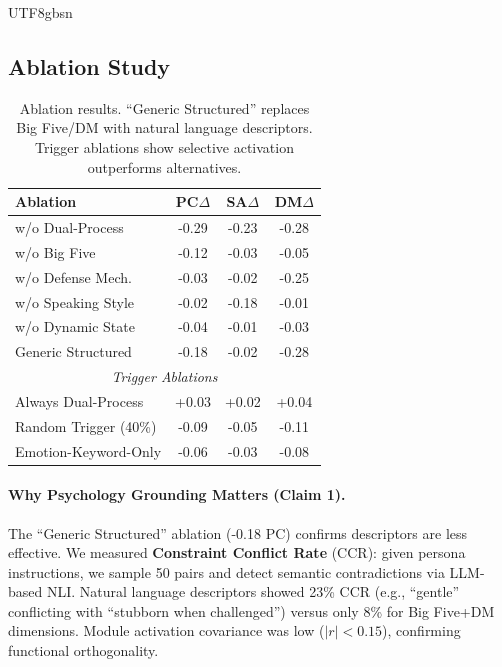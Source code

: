 \documentclass[11pt]{article}
\begin{document}
\begin{CJK*}{UTF8}{gbsn}
\subsection{Ablation Study}
\label{sec:ablation}

\begin{table}[t]
\centering
\small
\begin{tabular}{lccc}
\toprule
\textbf{Ablation} & \textbf{PC}$\Delta$ & \textbf{SA}$\Delta$ & \textbf{DM}$\Delta$ \\
\midrule
w/o Dual-Process & -0.29 & -0.23 & -0.28 \\
w/o Big Five & -0.12 & -0.03 & -0.05 \\
w/o Defense Mech. & -0.03 & -0.02 & -0.25 \\
w/o Speaking Style & -0.02 & -0.18 & -0.01 \\
w/o Dynamic State & -0.04 & -0.01 & -0.03 \\
Generic Structured & -0.18 & -0.02 & -0.28 \\
\midrule
\multicolumn{4}{c}{\textit{Trigger Ablations}} \\
\midrule
Always Dual-Process & +0.03 & +0.02 & +0.04 \\
Random Trigger (40\%) & -0.09 & -0.05 & -0.11 \\
Emotion-Keyword-Only & -0.06 & -0.03 & -0.08 \\
\bottomrule
\end{tabular}
\caption{Ablation results. ``Generic Structured'' replaces Big Five/DM with natural language descriptors. Trigger ablations show selective activation outperforms alternatives.}
\label{tab:ablation}
\end{table}


\paragraph{Why Psychology Grounding Matters (Claim 1).} The ``Generic Structured'' ablation (-0.18 PC) confirms descriptors are less effective. We measured \textbf{Constraint Conflict Rate} (CCR): given persona instructions, we sample 50 pairs and detect semantic contradictions via LLM-based NLI. Natural language descriptors showed 23\% CCR (e.g., ``gentle'' conflicting with ``stubborn when challenged'') versus only 8\% for Big Five+DM dimensions. Module activation covariance was low ($|r| < 0.15$), confirming functional orthogonality.


\end{CJK*}
\end{document}
